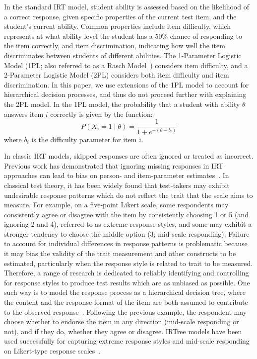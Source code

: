 \documentclass{edm_article}
\begin{document}

In the standard IRT model, student ability is assessed based on the likelihood of a correct response, given specific properties of the current test item, and the student's current ability. Common properties include item difficulty, which represents at what ability level the student has a 50\% chance of responding to the item correctly, and item discrimination, indicating how well the item discriminates between students of different abilities. The 1-Parameter Logistic Model (1PL; also referred to as a Rasch Model~\cite{rasch1993probabilistic}) considers item difficulty, and a 2-Parameter Logistic Model (2PL) considers both item difficulty and item discrimination. In this paper, we use extensions of the 1PL model to account for hierarchical decision processes, and thus do not proceed further with explaining the 2PL model. In the 1PL model, the probability that a student with ability $\theta$ answers item $i$ correctly is given by the function: 
\begin{equation}
  P(X_i = 1 \mid \theta) = \frac{1}{1 + e^{-(\theta - b_i)}}
\end{equation}
where $b_i$ is the difficulty parameter for item $i$. 

In classic IRT models, skipped responses are often ignored or treated as incorrect. 
Previous work has demonstrated that ignoring missing responses in IRT approaches can lead to bias on person- and item-parameter estimates~\cite{finch2008estimation, mislevy1996missing, pohl2014dealing, holman2005modelling, debeer2017modeling}. In classical test theory, it has been widely found that test-takers may exhibit undesirable response patterns which do not reflect the trait that the scale aims to measure. For example, on a five-point Likert scale, some respondents may consistently agree or disagree with the item by consistently choosing 1 or 5 (and ignoring 2 and 4), referred to as extreme response styles, and some may exhibit a stronger tendency to choose the middle option (3; mid-scale responding). Failure to account for individual differences in response patterns is problematic because it may bias the validity of the trait measurement and other constructs to be estimated,  particularly when the response style is related to trait to be measured. Therefore, a range of research is dedicated to reliably identifying and controlling for response styles to produce test results which are as unbiased as possible. One such way is to model the response process as a hierarchical decision tree, where the content and the response format of the item are both assumed to contribute to the observed response~\cite{bockenholt2012modeling, de2012irtrees, thissen2013two}. Following the previous example, the respondent may choose whether to endorse the item in any direction (mid-scale responding or not), and if they do, whether they agree or disagree. IRTree models have been used successfully for capturing extreme response styles and mid-scale responding on Likert-type response scales~\cite{bockenholt2017response, thissen2013two}. 
\end{document}

